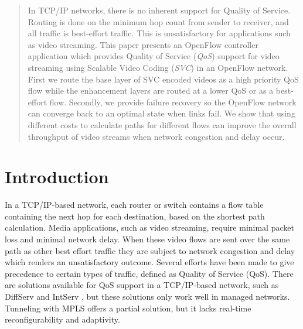 \documentclass[conference]{IEEEtran}
\begin{document}
\begin{abstract}
In TCP/IP networks, there is no inherent support for Quality of Service.
Routing is done on the minimum hop count from sender to receiver, and all traffic is best-effort traffic. 
This is unsatisfactory for applications such as video streaming. 
This paper presents an OpenFlow controller application which provides 
Quality of Service (\textit{QoS}) support for video streaming using Scalable Video Coding (\textit{SVC}) in an OpenFlow network. 
First we route the base layer of SVC encoded videos as a 
high priority QoS flow while the enhancement layers are routed at a lower QoS or as a best-effort flow. 
Secondly, we provide failure recovery so the OpenFlow network can converge back to an optimal 
state when links fail. We show that using different costs to calculate paths for different flows 
can improve the overall throughput of video streams when network congestion and delay occur.
\end{abstract}





%
\IEEEpeerreviewmaketitle



\section{Introduction}
In a TCP/IP-based network, each router or switch contains a flow table containing the 
next hop for each destination, based on the shortest path calculation. 
Media applications, such as video streaming, 
require minimal packet loss and minimal network delay. 
When these video flows are sent over the same path as other best effort traffic they 
are subject to network congestion and delay which renders an unsatisfactory outcome. 
Several efforts have been made to give precedence to certain types of traffic, defined as Quality of Service (QoS).
There are solutions available for QoS support in a TCP/IP-based network, 
such as DiffServ \cite{diffserv} and IntServ \cite{intserv}, but these 
solutions only work well in managed networks.
Tunneling with MPLS offers a partial solution, but it lacks real-time reconfigurability and adaptivity. \cite{mpls}\\
\end{document}
